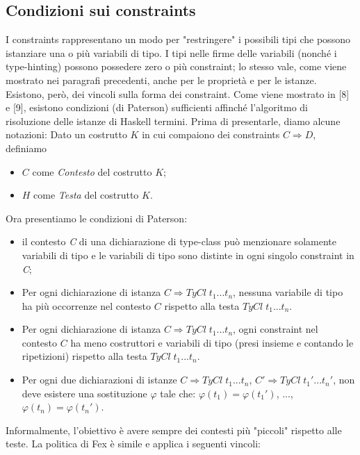 \documentclass[10pt,a4paper]{article}
\begin{document}
\subsection{Condizioni sui constraints}
I constraints rappresentano un modo per "restringere" i possibili tipi che possono istanziare una o più variabili di
tipo. I tipi nelle firme delle variabili (nonché i type-hinting) possono possedere zero o più constraint; lo stesso
vale, come viene mostrato nei paragrafi precedenti, anche per le proprietà e per le istanze. Esistono, però, dei
vincoli sulla forma dei constraint. Come viene mostrato in [8] e [9], esistono condizioni (di Paterson) sufficienti
affinché l'algoritmo di risoluzione delle istanze di Haskell termini. Prima di presentarle, diamo alcune notazioni:
\newline Dato un costrutto $ K $ in cui compaiono dei constraints $ C \Rightarrow D $, definiamo
\begin{itemize}
    \item $ C $ come \textit{Contesto} del costrutto $ K $;
    \item $ H $ come \textit{Testa} del costrutto $ K $.
\end{itemize}
Ora presentiamo le condizioni di Paterson:
\begin{itemize}
    \item il contesto \textit{C} di una dichiarazione di type-class può menzionare solamente variabili di tipo e
    le variabili di tipo sono distinte in ogni singolo constraint in \textit{C};
    \item Per ogni dichiarazione di istanza $ C \Rightarrow TyCl \; t_1 ... t_n $, nessuna variabile di tipo ha
    più occorrenze nel contesto $ C $ rispetto alla testa $ TyCl \; t_1 ... t_n $.
    \item Per ogni dichiarazione di istanza $ C \Rightarrow TyCl \; t_1 ... t_n $, ogni constraint nel contesto
    $ C $ ha meno costruttori e variabili di tipo (presi insieme e contando le ripetizioni) rispetto alla testa
    $ TyCl \; t_1 ... t_n $.
    \item Per ogni due dichiarazioni di istanze $ C \Rightarrow TyCl \; t_1 ... t_n $,
    $ C' \Rightarrow TyCl \; t_1' ... t_n' $, non deve esistere una sostituzione $ \varphi $ tale che:
    $ \varphi(t_1) = \varphi(t_1') $, ..., $ \varphi(t_n) = \varphi(t_n') $.
\end{itemize}
Informalmente, l'obiettivo è avere sempre dei contesti più "piccoli" rispetto alle teste. La politica di Fex è
simile e applica i seguenti vincoli:
\end{document}
